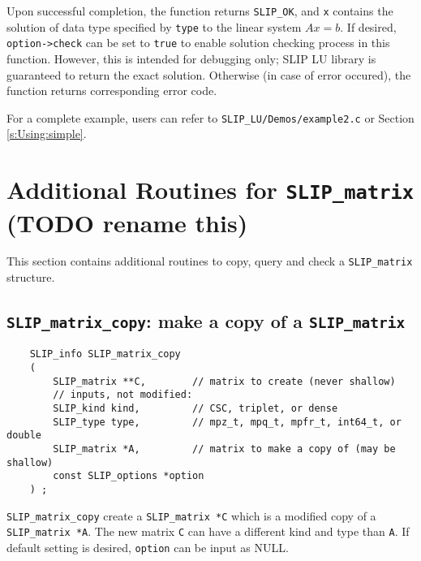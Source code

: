 \documentclass[12pt]{article}
\theoremstyle{definition}
\begin{document}
Upon successful completion, the function returns \verb|SLIP_OK|, and
\verb|x| contains the solution of data type specified by
\verb|type| to the linear system $Ax=b$. If desired, \verb|option->check| can
be set to \verb|true| to enable solution checking process in this function.
However, this is intended for debugging only; SLIP LU library is guaranteed to
return the exact solution. Otherwise (in case of error occured), the function
returns corresponding error code.

For a complete example, users can refer to \verb|SLIP_LU/Demos/example2.c|
or Section \ref{s:Using:simple}.


\cprotect\section{Additional Routines for \verb|SLIP_matrix| (TODO rename this)}
\label{s:SLIP_matrix_routine}

This section contains additional routines to copy, query and check a
\verb|SLIP_matrix| structure.


\cprotect\subsection{\verb|SLIP_matrix_copy|: make a copy of a \verb|SLIP_matrix|}
\label{s:user:matrix_copy}

\begin{mdframed}[userdefinedwidth=6in]
{\footnotesize
\begin{verbatim}
    SLIP_info SLIP_matrix_copy
    (
        SLIP_matrix **C,        // matrix to create (never shallow)
        // inputs, not modified:
        SLIP_kind kind,         // CSC, triplet, or dense
        SLIP_type type,         // mpz_t, mpq_t, mpfr_t, int64_t, or double
        SLIP_matrix *A,         // matrix to make a copy of (may be shallow)
        const SLIP_options *option
    ) ;
\end{verbatim}
} \end{mdframed}

\verb|SLIP_matrix_copy| create a \verb|SLIP_matrix *C| which is a modified copy
of a \verb|SLIP_matrix *A|. The new matrix \verb|C| can have a different
kind and type than \verb|A|.
If default setting is desired, \verb|option| can be input as NULL.
\end{document}
